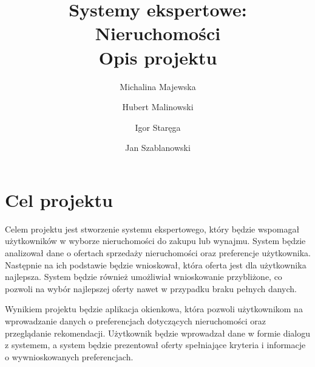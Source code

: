 \documentclass{article}
\title{Systemy ekspertowe: Nieruchomości \\ \large{Opis projektu}}
\author{Michalina Majewska
	\and Hubert Malinowski
	\and Igor Staręga
	\and Jan Szablanowski}
\begin{document}
\maketitle

\section{Cel projektu}
Celem projektu jest stworzenie systemu ekspertowego, który będzie wspomagał użytkowników w wyborze nieruchomości do zakupu lub wynajmu. System będzie analizował dane o ofertach sprzedaży nieruchomości oraz preferencje użytkownika. Następnie na ich podstawie będzie wnioskował, która oferta jest dla użytkownika najlepsza. System będzie również umożliwiał wnioskowanie przybliżone, co pozwoli na wybór najlepszej oferty nawet w przypadku braku pełnych danych.

Wynikiem projektu będzie aplikacja okienkowa, która pozwoli użytkownikom na wprowadzanie danych o preferencjach dotyczących nieruchomości oraz przeglądanie rekomendacji. Użytkownik będzie wprowadzał dane w formie dialogu z systemem, a system będzie prezentował oferty spełniające kryteria i informacje o wywnioskowanych preferencjach.




\end{document}
